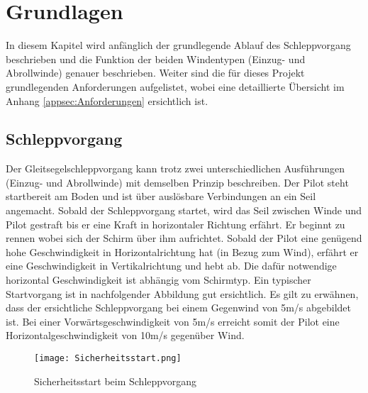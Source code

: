 \section{Grundlagen}\label{sec:Grundlagen}
In diesem Kapitel wird anfänglich der grundlegende Ablauf des Schleppvorgang beschrieben und die Funktion der beiden Windentypen (Einzug- und Abrollwinde) genauer beschrieben. Weiter sind die für dieses Projekt grundlegenden Anforderungen aufgelistet, wobei eine detaillierte Übersicht im Anhang \ref{appsec:Anforderungen} ersichtlich ist.



\subsection{Schleppvorgang}\label{subsec:Schleppvorgang}
Der Gleitsegelschleppvorgang kann trotz zwei unterschiedlichen Ausführungen (Einzug- und Abrollwinde) mit demselben Prinzip beschreiben. Der Pilot steht startbereit am Boden und ist über auslösbare Verbindungen an ein Seil angemacht. Sobald der Schleppvorgang startet, wird das Seil zwischen Winde und Pilot gestraft bis er eine Kraft in horizontaler Richtung erfährt. Er beginnt zu rennen wobei sich der Schirm über ihm aufrichtet. Sobald der Pilot eine genügend hohe Geschwindigkeit in Horizontalrichtung hat (in Bezug zum Wind), erfährt er eine Geschwindigkeit in Vertikalrichtung und hebt ab. Die dafür notwendige horizontal Geschwindigkeit ist abhängig vom Schirmtyp. Ein typischer Startvorgang ist in nachfolgender Abbildung gut ersichtlich. Es gilt zu erwähnen, dass der ersichtliche Schleppvorgang bei einem Gegenwind von 5m/s abgebildet ist. Bei einer Vorwärtsgeschwindigkeit von 5m/s erreicht somit der Pilot eine Horizontalgeschwindigkeit von 10m/s gegenüber Wind.

\begin{figure}[H]
	\begin{center}
		\texttt{[image: Sicherheitsstart.png]}
		\caption{Sicherheitsstart beim Schleppvorgang \cite{Gleitsegelschlepp}}
		\label{fig:Sicherheitsstart}
	\end{center}
\end{figure}

